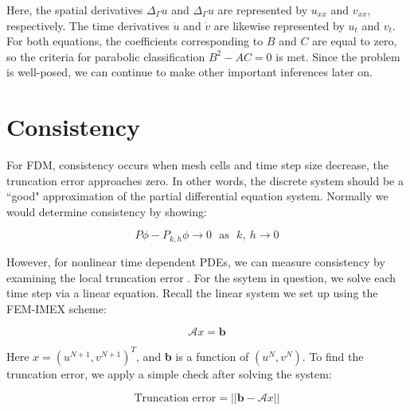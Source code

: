 \documentclass[12pt]{article}
\begin{document}
Here, the spatial derivatives $\Delta_\Gamma u$ and $\Delta_\Gamma u$ are represented by $u_{xx}$ and $v_{xx}$, respectively. The time derivatives $\dot{u}$ and $\dot{v}$ are likewise represented by $u_t$ and $v_t$. For both equations, the coefficients corresponding to $B$ and $C$ are equal to zero, so the criteria for parabolic classification $B^2-AC=0$ is met. Since the problem is well-posed, we can continue to make other important inferences later on.


























\section{Consistency}

For FDM, consistency occurs when mesh cells and time step size decrease, the truncation error approaches zero. In other words, the discrete system should be a ``good" approximation of the partial differential equation system. Normally we would determine consistency by showing:

\begin{equation}
	P\phi - P_{k,h}\phi \rightarrow 0 ~~~\text{as} ~~~ k,~h \rightarrow 0
\end{equation}

However, for nonlinear time dependent PDEs, we can measure consistency by examining the local truncation error \cite{Tadmor2012}. For the ssytem in question, we solve each time step via a linear equation. Recall the linear system we set up using the FEM-IMEX scheme:

\begin{equation}
	\mathcal{A}x=\textbf{b}
\end{equation}

\noindent Here $x=(u^{N+1}, v^{N+1})^T$, and \textbf{b} is a function of $(u^N, v^N)$. To find the truncation error, we apply a simple check after solving the system:

\begin{equation}\label{norm}
	\text{Truncation error} = ||\textbf{b}-\mathcal{A}x|| 
\end{equation}
\end{document}
